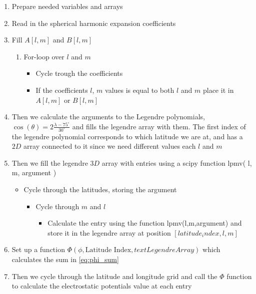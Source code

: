 \documentclass[x11names]{article}
\begin{document}
      \begin{enumerate}
        \item Prepare needed variables and arrays
        \item Read in the spherical harmonic expansion coefficients
        \item Fill \(A[l,m]\) and \(B[l,m]\)
          \begin{enumerate}
            \item For-loop over \(l\) and \(m\)
            \begin{itemize}
              \item Cycle trough the coefficients
              \item If the coefficients \(l\), \(m\) values is equal to both \(l\) and \(m\) place it in \(A[l,m]\) or \(B[l,m]\)
            \end{itemize}
          \end{enumerate}
        \item Then we calculate the arguments to the Legendre polynomials, \(\cos(\theta) = 2\frac{\lambda - 75^\circ}{30^\circ}\) and fills the legendre array with them.
              The first index of the legendre polynomial corresponds to which latitude we are at, and has a \(2D\) array connected to it since we need different values each \(l\) and \(m\)
        \item Then we fill the legendre \(3D\) array with entries using a scipy function lpmv( l, m, argument )
          \begin{itemize}
            \item Cycle through the latitudes, storing the argument
            \begin{itemize}
              \item Cycle through \(m\) and \(l\)
                \begin{itemize}
                  \item Calculate the entry using the function lpmv(l,m,argument) and store it in the legendre array at position \([ latitude_index, l, m ]\)
                \end{itemize}
            \end{itemize}
          \end{itemize}
        \item Set up a function \(\Phi( \phi, \text{Latitude Index}, text{Legendre Array} )\) which calculates the sum in \cref{eq:phi_sum}
        \item Then we cycle through the latitude and longitude grid and call the \(\Phi\) function to calculate the electrostatic potentials value at each entry
      \end{enumerate}
\end{document}
